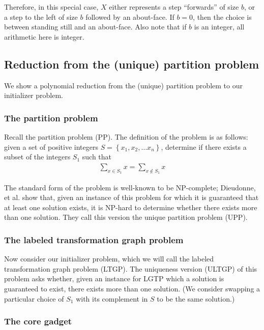 Therefore, in this special case, $X$ either represents a step ``forwards'' of size $b$,
or a step to the left of size $b$ followed by an about-face. If $b = 0$, then the choice 
is between standing still and an about-face. Also note that if $b$ is an integer, all
arithmetic here is integer.

\subsection{Reduction from the (unique) partition problem}

We show a polynomial reduction from the (unique) partition problem to our initializer problem.

\subsubsection{The partition problem}

Recall the partition problem (PP). The definition of the problem is as follows:
given a set of positive integers $S = \left\{ x_1, x_2, \ldots x_n \right\}$, 
determine if there exists a subset of the integers $S_1$ such that
\begin{align}
	\sum_{x \in S_1} x = \sum_{x \not \in S_1} x
\end{align}

The standard form of the problem is well-known to be NP-complete; 
Dieudonne, et al. \cite{Dieudonne2010} show that, given an instance of this problem 
for which it is guaranteed that at least one solution exists, it is NP-hard
to determine whether there exists more than one solution.
They call this version the unique partition problem (UPP).

\subsubsection{The labeled transformation graph problem}

Now consider our initializer problem, which we will call the 
labeled transformation graph problem (LTGP).
The uniqueness version (ULTGP) of this problem asks whether, given an instance for LGTP which a solution
is guaranteed to exist, there exists more than one solution. (We consider swapping a particular choice
of $S_1$ with its complement in $S$ to be the same solution.)

\subsubsection{The core gadget}

